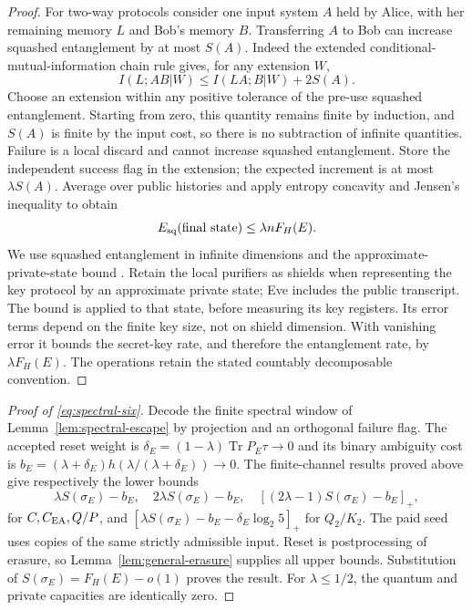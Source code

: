 \documentclass[11pt]{article}
\newcommand{\Tr}{\operatorname{Tr}}
\begin{document}
\begin{proof}
For two-way protocols consider one input system $A$ held by Alice,
with her remaining memory $L$ and Bob's memory $B$. Transferring $A$
to Bob can increase squashed entanglement by at most $S(A)$.
Indeed the extended conditional-mutual-information chain rule
\cite[equation (14)]{shirokovcontinuity} gives, for any extension $W$,
\[
 I(L;AB|W)\le I(LA;B|W)+2S(A).
\]
Choose an extension within any positive tolerance of the pre-use
squashed entanglement. Starting from zero, this quantity remains
finite by induction, and $S(A)$ is finite by the input cost, so
there is no subtraction of infinite quantities. Failure is a local
discard and cannot increase squashed entanglement. Store the
independent success flag in the extension; the expected increment
is at most $\lambda S(A)$. Average over public histories and apply
entropy concavity and Jensen's inequality to obtain
\[
 E_{\rm sq}(\text{final state})\le\lambda nF_H(E).
\]
We use squashed entanglement in infinite dimensions
\cite[Proposition 2B]{shirokovsquashed} and the approximate-private-state bound
\cite[Theorem 2]{wildeprivate}. Retain the local purifiers
as shields when representing the key protocol by an approximate private
state; Eve includes the public transcript. The bound is applied to
that state, before measuring its key registers. Its error terms
depend on the finite key size, not on shield dimension.
With vanishing error it bounds the secret-key rate, and therefore
the entanglement rate, by $\lambda F_H(E)$.
The operations retain the stated countably decomposable convention.
\end{proof}

\begin{proof}[Proof of \eqref{eq:spectral-six}]
Decode the finite spectral window of Lemma~\ref{lem:spectral-escape}
by projection and an orthogonal failure flag. The accepted reset
weight is $\delta_E=(1-\lambda)\Tr P_E\tau\to0$ and its binary
ambiguity cost is $b_E=(\lambda+\delta_E)
h(\lambda/(\lambda+\delta_E))\to0$.
The finite-channel results proved above give respectively the lower
bounds
\[
 \lambda S(\sigma_E)-b_E,\quad
 2\lambda S(\sigma_E)-b_E,\quad
 [(2\lambda-1)S(\sigma_E)-b_E]_+,
\]
for $C,C_{\rm EA},Q/P$, and
$[\lambda S(\sigma_E)-b_E-\delta_E\log_2 5]_+$ for $Q_2/K_2$.
The paid seed uses copies of the same strictly admissible input.
Reset is postprocessing of erasure, so Lemma~\ref{lem:general-erasure}
supplies all upper bounds. Substitution of
$S(\sigma_E)=F_H(E)-o(1)$ proves the result. For $\lambda\le1/2$,
the quantum and private capacities are identically zero.
\end{proof}
\end{document}
